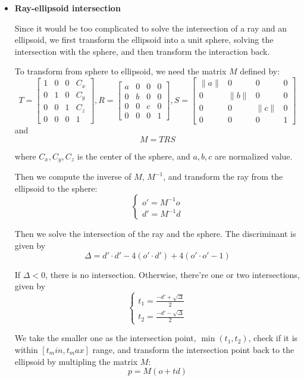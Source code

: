 \documentclass[acmtog]{acmart}
\begin{document}
\begin{itemize}
	\item \textbf{Ray-ellipsoid intersection}
	
	Since it would be too complicated to solve the intersection of a ray and an ellipsoid, we first transform the ellipsoid into a unit sphere, solving the intersection with the sphere, and then transform the interaction back. 

	To transform from sphere to ellipsoid, we need the matrix $M$ defined by:
	\[
		T = \begin{bmatrix}
			1 & 0 & 0 & C_x \\
			0 & 1 & 0 & C_y \\
			0 & 0 & 1 & C_z \\
			0 & 0 & 0 & 1
		\end{bmatrix},
		R = \begin{bmatrix}
			a & 0 & 0 & 0 \\
			0 & b & 0 & 0 \\
			0 & 0 & c & 0 \\
			0 & 0 & 0 & 1
		\end{bmatrix},
		S = \begin{bmatrix}
			\|a\| & 0 & 0 & 0 \\
			0 & \|b\| & 0 & 0 \\
			0 & 0 & \|c\| & 0 \\
			0 & 0 & 0 & 1
		\end{bmatrix}
	\]
	and \[
		M = TRS
	\]

	where $C_x, C_y, C_z$ is the center of the sphere, and $a, b, c$ are normalized value. 

	Then we compute the inverse of $M$, $M^{-1}$, and transform the ray from the ellipsoid to the sphere: \[
		\begin{cases}
			o' = M^{-1} o \\
			d' = M^{-1} d
		\end{cases}
	\]

	Then we solve the intersection of the ray and the sphere. The discriminant is given by \[
		\Delta = d' \cdot d' - 4 (o' \cdot d') + 4 (o' \cdot o' - 1)
	\]

	If $\Delta < 0$, there is no intersection. Otherwise, there're one or two intersections, given by \[
		\begin{cases}
			t_1 = \frac{-d' + \sqrt{\Delta}}{2} \\
			t_2 = \frac{-d' - \sqrt{\Delta}}{2}
		\end{cases}
	\]

	We take the smaller one as the intersection point, $\min(t_1, t_2)$, check if it is within $[t_min, t_max]$ range, and transform the intersection point back to the ellipsoid by multipling the matrix $M$: \[
		p = M (o + td)
	\]


\end{itemize}
\end{document}
